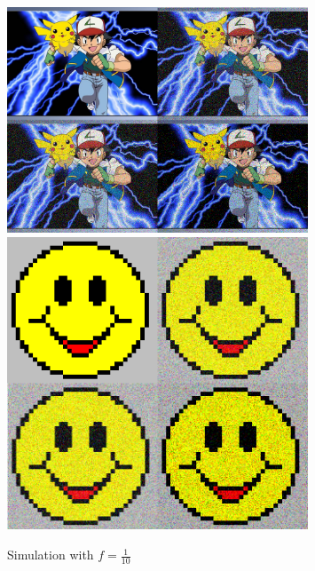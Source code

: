 \documentclass[12pt, a4paper]{article}
\begin{document}
\begin{figure}[H]
	\centering
	\includegraphics[width=0.8\textwidth]{pokemon_tile10.png}
	\includegraphics[width=0.8\textwidth]{smiley_tile10.png}
	\caption{Simulation with $f = \frac{1}{10}$}
\end{figure}
\end{document}
